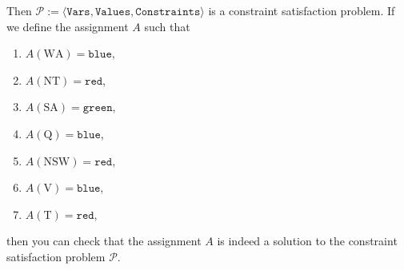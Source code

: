 Then $\mathcal{P} := \langle \mathtt{Vars}, \mathtt{Values}, \mathtt{Constraints} \rangle$ is a constraint satisfaction problem.  
If we define the assignment $A$ such that
\begin{enumerate}
\item $A(\mathrm{WA}) = \mathtt{blue}$,
\item $A(\mathrm{NT}) = \mathtt{red}$,
\item $A(\mathrm{SA}) = \mathtt{green}$,
\item $A(\mathrm{Q}) = \mathtt{blue}$,
\item $A(\mathrm{NSW}) = \mathtt{red}$,
\item $A(\mathrm{V}) = \mathtt{blue}$,
\item $A(\mathrm{T}) = \mathtt{red}$,
\end{enumerate}
then you can check that the assignment $A$ is indeed a solution to the constraint satisfaction problem $\mathcal{P}$.

